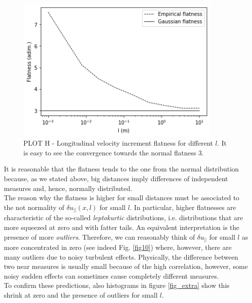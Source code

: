 \documentclass[11pt,titlepage]{article}
\begin{document}
\begin{center}
	\begin{figure} [h]
		\centering
		\includegraphics[width = 4in]{./figures/ex1_6_1.png}
		\caption{PLOT H - Longitudinal velocity increment flatness for different $l$. It is easy to see the convergence towards the normal flatness 3.}
		\label{fig11}
	\end{figure}
\end{center}
It is reasonable that the flatness tends to the one from the normal distribution because, as we stated above, big distances imply differences of independent measures and, hence, normally distributed. \\
The reason why the flatness is higher for small distances must be associated to the not normality of $\delta u_{||}(x,l)$ for small $l$. In particular, higher flatnesses are characteristic of the so-called \emph{leptokurtic} distributions, i.e. distributions that are more squeezed at zero and with fatter tails. An equivalent interpretation is the presence of more \emph{outliers}. Therefore, we can reasonably think of $\delta u_{||}$ for small $l$ as more concentrated in zero (see indeed Fig. \ref{fig10}) where, however, there are many outliers due to noisy turbulent effects. Physically, the difference between two near measures is usually small because of the high correlation, however, some noisy sudden effects can sometimes cause completely different measures.  \\
To confirm these predictions, also histograms in figure \ref{fig_extra} show this shrink at zero and the presence of outliers for small $l$.
\end{document}
